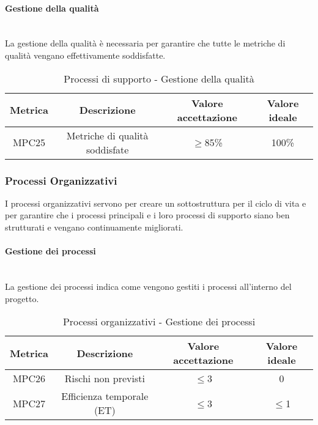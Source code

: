 \documentclass[11pt]{article}
\begin{document}
\begin{justify}
\newpage

\paragraph{Gestione della qualità}\mbox{}\\
La gestione della qualità è necessaria per garantire che tutte le metriche di qualità vengano effettivamente soddisfatte.\\
\begin{table}[H]
  \centering
\begin{tabular}{|c|c|c|c|}
  \hline
  \textbf{Metrica} & \textbf{Descrizione} & \textbf{Valore accettazione} & \textbf{Valore ideale}\\
  \hline
  MPC25 & Metriche di qualità soddisfate & $\geq$85\% & 100\% \\
  \hline
\end{tabular}
\caption{Processi di supporto - Gestione della qualità}
\label{tab:gestione della qualità}
\end{table}

\subsubsection{Processi Organizzativi}
I processi organizzativi servono per creare un sottostruttura per il ciclo di vita e
per garantire che i processi principali e i loro processi di supporto siano ben strutturati e vengano continuamente migliorati.\\
\paragraph{Gestione dei processi}\mbox{}\\
La gestione dei processi indica come vengono gestiti i processi all'interno del progetto.\\
\begin{table}[H]
  \centering
\begin{tabular}{|c|c|c|c|}
  \hline
  \textbf{Metrica} & \textbf{Descrizione} & \textbf{Valore accettazione} & \textbf{Valore ideale}\\
  \hline
  MPC26 & Rischi non previsti & $\leq$3 & 0 \\
  \hline
  MPC27 & Efficienza temporale (ET) & $\leq$3 & $\leq$1 \\
  \hline
\end{tabular}
\caption{Processi organizzativi - Gestione dei processi}
\label{tab:gestione dei processi}
\end{table}

\end{justify}
\end{document}
